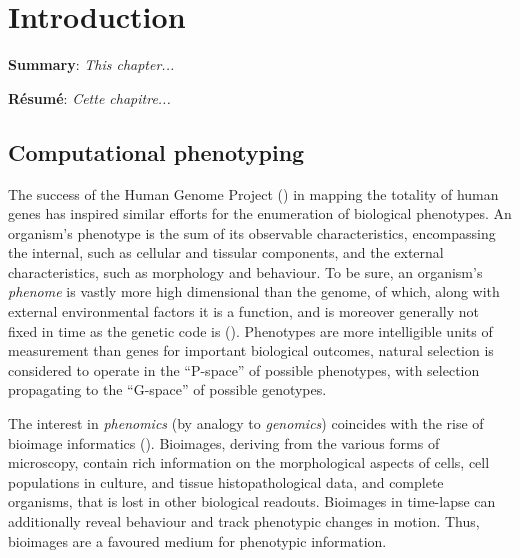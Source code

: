 
\chapter{Introduction} %

\label{Chapter1} %

\textbf{Summary}: \emph{This chapter...}

\textbf{R\'esum\'e}: \emph{Cette chapitre...}



\section{Computational phenotyping}

The success of the Human Genome Project (\cite{lander2001initial}) in mapping the totality of human genes has inspired similar efforts for the enumeration of biological phenotypes. An organism's phenotype is the sum of its observable characteristics, encompassing the internal, such as cellular and tissular components, and the external characteristics, such as morphology and behaviour. To be sure, an organism's \emph{phenome} is vastly more high dimensional than the genome, of which, along with external environmental factors it is a function, and is moreover generally not fixed in time as the genetic code is (\cite{houle2010phenomics}). Phenotypes are more intelligible units of measurement than genes for important biological outcomes, natural selection is considered to operate in the ``P-space'' of possible phenotypes, with selection propagating to the ``G-space'' of possible genotypes.

The interest in \emph{phenomics} (by analogy to \emph{genomics}) coincides with the rise of bioimage informatics (\cite{myers2012bioimage}). Bioimages, deriving from the various forms of microscopy, contain rich information on the morphological aspects of cells, cell populations in culture, and tissue histopathological data, and complete organisms, that is lost in other biological readouts. Bioimages in time-lapse can additionally reveal behaviour and track phenotypic changes in motion. Thus, bioimages are a favoured medium for phenotypic information.

